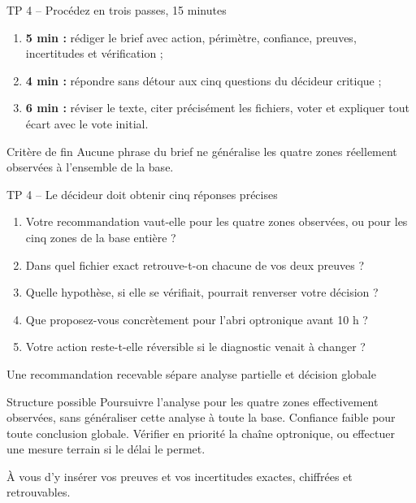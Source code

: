 \documentclass[aspectratio=169]{beamer}
\begin{document}
\begin{frame}{TP 4 -- Procédez en trois passes, 15 minutes}
\begin{enumerate}
\item \textbf{5 min :} rédiger le brief avec action, périmètre, confiance, preuves, incertitudes et vérification ;
\item \textbf{4 min :} répondre sans détour aux cinq questions du décideur critique ;
\item \textbf{6 min :} réviser le texte, citer précisément les fichiers, voter et expliquer tout écart avec le vote initial.
\end{enumerate}
\begin{block}{Critère de fin}
Aucune phrase du brief ne généralise les quatre zones réellement observées à l'ensemble de la base.
\end{block}
\end{frame}

\begin{frame}{TP 4 -- Le décideur doit obtenir cinq réponses précises}
\small
\begin{enumerate}
\item Votre recommandation vaut-elle pour les quatre zones observées, ou pour les cinq zones de la base entière ?
\item Dans quel fichier exact retrouve-t-on chacune de vos deux preuves ?
\item Quelle hypothèse, si elle se vérifiait, pourrait renverser votre décision ?
\item Que proposez-vous concrètement pour l'abri optronique avant 10 h ?
\item Votre action reste-t-elle réversible si le diagnostic venait à changer ?
\end{enumerate}
\end{frame}

\begin{frame}{Une recommandation recevable sépare analyse partielle et décision globale}
\begin{block}{Structure possible}
Poursuivre l'analyse pour les quatre zones effectivement observées, sans généraliser cette analyse à toute la base. Confiance faible pour toute conclusion globale. Vérifier en priorité la chaîne optronique, ou effectuer une mesure terrain si le délai le permet.
\end{block}
À vous d'y insérer vos preuves et vos incertitudes exactes, chiffrées et retrouvables.
\end{frame}
\end{document}
